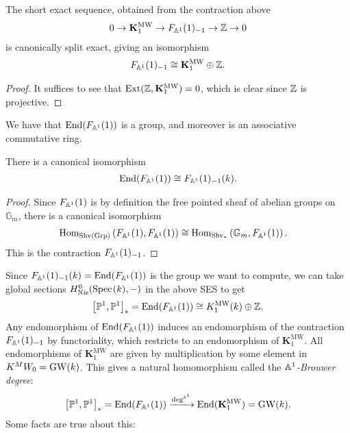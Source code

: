 \documentclass[11pt,openany]{book}
\providecommand{\MW}{\mathrm{MW}}
\providecommand{\KMW}{\mathbf{K}^\mathrm{MW}}
\begin{document}
\begin{proposition} The short exact sequence, obtained from the contraction above
\begin{align*}
    0 \to \KMW_1 \to F_{\A^1}(1)_{-1} \to \Z \to 0
\end{align*}
is canonically split exact, giving an isomorphism
\begin{align*}
    F_{\A^1}(1)_{-1} \cong \KMW_1 \oplus \Z.
\end{align*}
\end{proposition}
\begin{proof} It suffices to see that $\Ext(\Z, \KMW_1) = 0$, which is clear since $\mathbb{Z}$ is projective.
\end{proof}

\begin{proposition} We have that $\mathrm{End}(F_{\mathbb{A}^1}(1))$ is a group, and moreover is an associative commutative ring.
\end{proposition}

\begin{proposition}\label{prop:end-FA1-global-sections-contraction} 
There is a canonical isomorphism
\begin{align*}
    \mathrm{End}(F_{\mathbb{A}^1}(1)) \cong F_{\mathbb{A}^1}(1)_{-1}(k).
\end{align*}
\end{proposition}
\begin{proof} Since $F_{\mathbb{A}^1}(1)$ is by definition the free pointed sheaf of abelian groups on $\mathbb{G}_m$, there is a canonical isomorphism
\begin{align*}
    \mathrm{Hom}_{\mathrm{Shv}(\mathrm{Grp})} \left( F_{\mathbb{A}^1}(1), F_{\mathbb{A}^1}(1) \right) &\cong \mathrm{Hom}_{\mathrm{Shv}_\ast} \left( \mathbb{G}_m, F_{\mathbb{A}^1}(1) \right).
\end{align*}
This is the contraction $F_{\mathbb{A}^1}(1)_{-1}$.
\end{proof}



Since $F_{\mathbb{A}^1}(1)_{-1}(k) = \mathrm{End}(F_{\mathbb{A}^1}(1))$ is the group we want to compute, we can take global sections $H^0_{\mathrm{Nis}}(\text{Spec}\hspace{0.1em}(k),-)$ in the above SES to get
\begin{equation}\label{eqn:global-sections-speck-fa1-contracted}
\begin{aligned}
    \left[ \P^1,\P^1 \right]_\ast = \End (F_{\A^1}(1)) \cong K_1^\MW(k) \oplus \Z.
\end{aligned}
\end{equation}
%
Any endomorphism of $\mathrm{End}(F_{\mathbb{A}^1}(1))$ induces an endomorphism of the contraction $F_{\mathbb{A}^1}(1)_{-1}$ by functoriality, which restricts to an endomorphism of $\KMW_1$. All endomorphisms of $\KMW_1$ are given by multiplication by some element in $K^MW_0 = \mathrm{GW}(k)$. This gives a natural homomorphism called the \textit{$\mathbb{A}^1$-Brouwer degree}:
\begin{align*}
    \left[ \P^1,\P^1 \right]_\ast = \End(F_{\A^1}(1)) \xto{\deg^{\A^1}} \End(\KMW_1) = \GW(k).
\end{align*}
%
Some facts are true about this:
\end{document}
